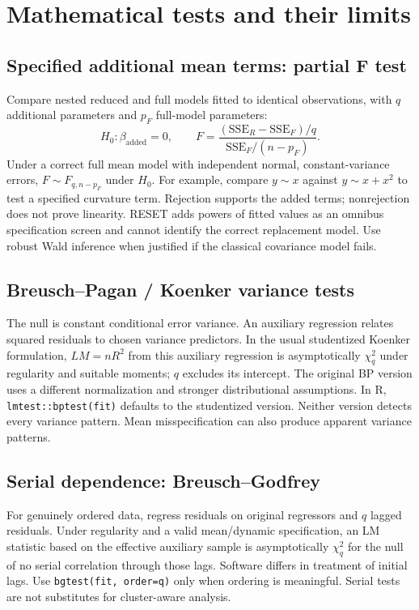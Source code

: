\documentclass[11pt]{article}
\begin{document}
\section{Mathematical tests and their limits}
\subsection{Specified additional mean terms: partial F test}
Compare nested reduced and full models fitted to identical observations, with $q$ additional parameters and $p_F$ full-model parameters:
\[H_0:\beta_{\mathrm{added}}=0,\qquad F=\frac{(\mathrm{SSE}_R-\mathrm{SSE}_F)/q}{\mathrm{SSE}_F/(n-p_F)}.\]
Under a correct full mean model with independent normal, constant-variance errors, $F\sim F_{q,n-p_F}$ under $H_0$. For example, compare $y\sim x$ against $y\sim x+x^2$ to test a specified curvature term. Rejection supports the added terms; nonrejection does not prove linearity. RESET adds powers of fitted values as an omnibus specification screen and cannot identify the correct replacement model. Use robust Wald inference when justified if the classical covariance model fails.
\subsection{Breusch--Pagan / Koenker variance tests}
The null is constant conditional error variance. An auxiliary regression relates squared residuals to chosen variance predictors. In the usual studentized Koenker formulation, $LM=nR^2$ from this auxiliary regression is asymptotically $\chi_q^2$ under regularity and suitable moments; $q$ excludes its intercept. The original BP version uses a different normalization and stronger distributional assumptions. In R, \texttt{lmtest::bptest(fit)} defaults to the studentized version. Neither version detects every variance pattern. Mean misspecification can also produce apparent variance patterns.
\subsection{Serial dependence: Breusch--Godfrey}
For genuinely ordered data, regress residuals on original regressors and $q$ lagged residuals. Under regularity and a valid mean/dynamic specification, an LM statistic based on the effective auxiliary sample is asymptotically $\chi_q^2$ for the null of no serial correlation through those lags. Software differs in treatment of initial lags. Use \texttt{bgtest(fit, order=q)} only when ordering is meaningful. Serial tests are not substitutes for cluster-aware analysis.
\end{document}
